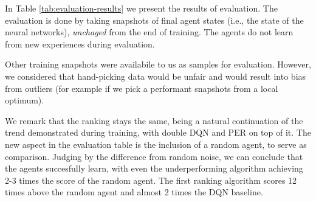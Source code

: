 In Table \ref{tab:evaluation-results} we present the results of evaluation.
The evaluation is done by taking snapshots of final agent states (i.e., the state of the neural networks), \emph{unchaged} from the end of training.
The agents do not learn from new experiences during evaluation.

Other training snapshots were availabile to us as samples for evaluation.
However, we considered that hand-picking data would be unfair and would result into bias from outliers (for example if we pick a performant snapshots from a local optimum).

We remark that the ranking stays the same, being a natural continuation of the trend demonstrated during training, with double DQN and PER on top of it.
The new aspect in the evaluation table is the inclusion of a random agent, to serve as comparison.
Judging by the difference from random noise, we can conclude that the agents succesfully learn, with even the underperforming algorithm achieving  2-3 times the score of the random agent. The first ranking algorithm scores 12 times above the random agent and almost 2 times the DQN baseline.